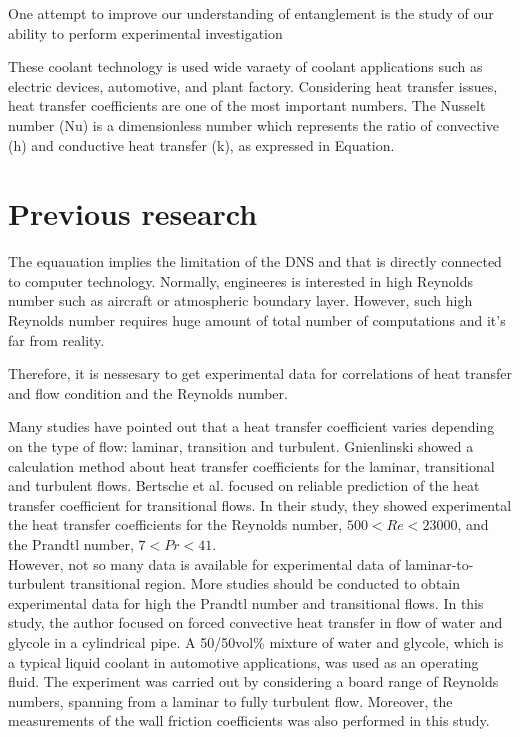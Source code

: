 \documentclass[12pt,oneside]{jbook}
\begin{document}
One attempt to improve our understanding of entanglement is the study of our ability to perform experimental investigation


These coolant technology is used wide varaety of coolant applications such as electric devices, automotive, and plant factory.
Considering heat transfer issues, heat transfer coefficients are one of the most important numbers.
The Nusselt number (Nu) is a dimensionless number which represents the ratio of convective (h) and conductive heat transfer (k), as expressed in Equation.
\section{Previous research}

The equauation implies the limitation of the DNS and that is directly connected to computer technology.
Normally, engineeres is interested in high Reynolds number such as aircraft or atmospheric boundary layer.
However, such high Reynolds number requires huge amount of total number of computations and it's far from reality.

Therefore, it is nessesary to get experimental data for correlations of heat transfer and flow condition and the Reynolds number.

Many studies have pointed out that a heat transfer coefficient varies depending on the type of flow: laminar, transition and turbulent.
Gnienlinski\cite{Gnielinski1975}\cite{Gnielinski1976} showed a calculation method about heat transfer coefficients for the laminar, transitional and turbulent flows.
Bertsche et al.\cite{Bertsche2016} focused on reliable prediction of the heat transfer coefficient for transitional flows.
In their study, they showed experimental the heat transfer coefficients for the Reynolds number, $500 < Re < 23000$, and the Prandtl number, $7 < Pr < 41$.\\
However, not so many data is available for experimental data of laminar-to-turbulent transitional region.
More studies should be conducted to obtain experimental data for high the Prandtl number and transitional flows.
In this study, the author focused on forced convective heat transfer in flow of water and glycole in a cylindrical pipe.
A 50/50vol\% mixture of water and glycole, which is a typical liquid coolant in automotive applications, was used as an operating fluid.
The experiment was carried out by considering a board range of Reynolds numbers, spanning from a laminar to fully turbulent flow.
Moreover, the measurements of the wall friction coefficients was also performed in this study.
\end{document}
